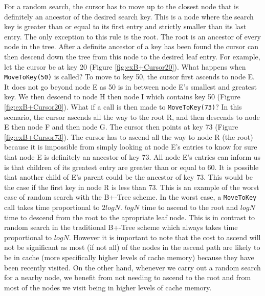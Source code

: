 For a random search, the cursor has to move up to the closest node that is definitely an ancestor of the desired search key. This is a node where the search key is greater than or equal to its first entry and strictly smaller than its last entry. The only exception to this rule is the root. The root is an ancestor of every node in the tree. After a definite ancestor of a key has been found the cursor can then descend down the tree from this node to the desired leaf entry. For example, let the cursor be at key 20 (Figure \ref{fig:exB+Cursor20}). What happens when \texttt{MoveToKey(50)} is called? To move to key 50, the cursor first ascends to node E. It does not go beyond node E as 50 is in between node E's smallest and greatest key. We then descend to node H then node I which contains key 50 (Figure \ref{fig:exB+Cursor20}). What if a call is then made to \texttt{MoveToKey(73)}? In this scenario, the cursor ascends all the way to the root R, and then descends to node E then node F and then node G. The cursor then points at key 73 (Figure \ref{fig:exB+Cursor73}). The cursor has to ascend all the way to node R (the root) because it is impossible from simply looking at node E's entries to know for sure that node E is definitely an ancestor of key 73. All node E's entries can inform us is that children of its greatest entry are greater than or equal to 60. It is possible that another child of E's parent could be the ancestor of key 73. This would be the case if the first key in node R is less than 73. This is an example of the worst case of random search with the B+-Tree scheme. In the worst case, a \texttt{MoveToKey} call takes time proportional to $2 log N$. $log N$ time to ascend to the root and $log N$ time to descend from the root to the apropriate leaf node. This is in contrast to random search in the traditional B+-Tree scheme which always takes time proportional to $log N$. However it is important to note that the cost to ascend will not be significant as most (if not all) of the nodes in the ascend path are likely to be in cache (more specifically higher levels of cache memory) because they have been recently visited. On the other hand, whenever we carry out a random search for a nearby node, we benefit from not needing to ascend to the root and from most of the nodes we visit being in higher levels of cache memory. 


